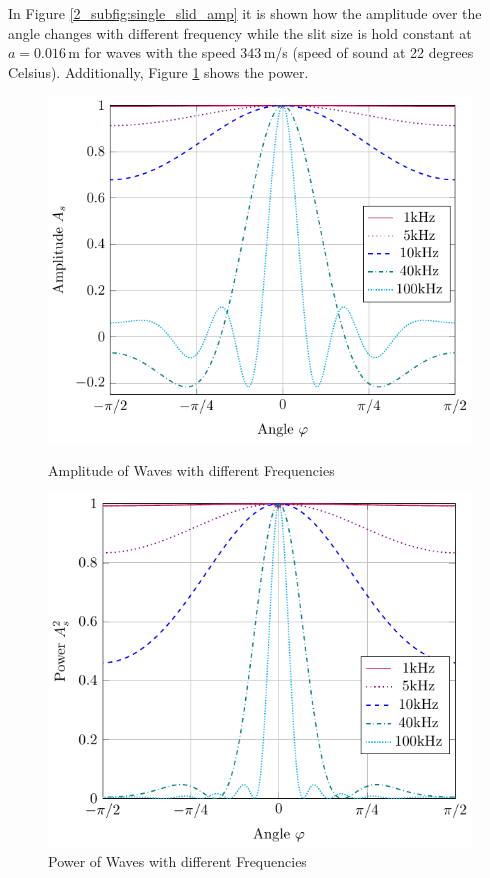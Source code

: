 In Figure \ref{2_subfig:single_slid_amp} it is shown how the amplitude over the angle changes with different frequency while the slit size is hold constant at $a = 0.016 \,$m for waves with the speed $343 \,$m/s (speed of sound at 22 degrees Celsius). Additionally, Figure \ref{2_subfig:single_slid_pow} shows the power. 
\begin{figure}
    \begin{minipage}{0.49\textwidth}
    \centering
    \includegraphics[width=\textwidth]{images/2_Preliminaries/Single_Slid_Frequency.pdf}
    \caption{Amplitude of Waves with different Frequencies}
    \label{2_subfig:single_slid_amp}
    \end{minipage}
    \begin{minipage}{0.49\textwidth}
    \centering
    \includegraphics[width=\textwidth]{images/2_Preliminaries/Single_Slid_Frequency_Power.pdf}
    \caption{Power of Waves with different Frequencies}
     \label{2_subfig:single_slid_pow}
    \end{minipage}
\end{figure}


